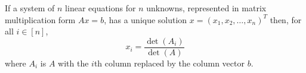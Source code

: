\begin{theorem}\label{thm:cramer}
	If a system of $n$ linear equations for $n$ unknowns, represented in matrix
	multiplication form $Ax=b$,
	has a unique solution $x=(x_1,x_2,\ldots,x_n)^T$ then, for all $i \in [n]$,
	$$
		x_i = \frac{\det(A_i)}{\det(A)}
	$$
	where $A_i$ is $A$ with the $i$th column replaced by the column vector $b$.
\end{theorem}
